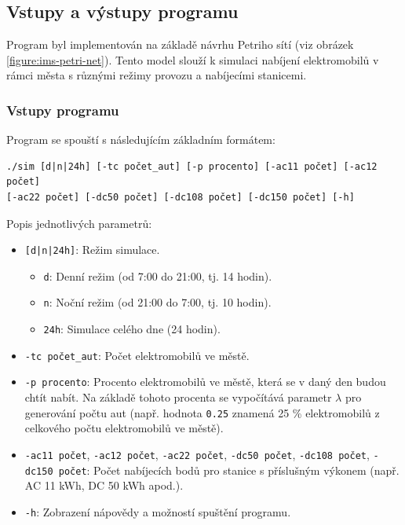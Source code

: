 \documentclass[a4paper,11pt]{article}
\begin{document}
\subsection{Vstupy a výstupy programu}

Program byl implementován na základě návrhu Petriho sítí (viz obrázek \ref{figure:ims-petri-net}). Tento model slouží k simulaci nabíjení elektromobilů v rámci města s různými režimy provozu a nabíjecími stanicemi.

\subsubsection{Vstupy programu}

Program se spouští s následujícím základním formátem:

\begin{verbatim}
./sim [d|n|24h] [-tc počet_aut] [-p procento] [-ac11 počet] [-ac12 počet]
[-ac22 počet] [-dc50 počet] [-dc108 počet] [-dc150 počet] [-h]
\end{verbatim}

Popis jednotlivých parametrů:
\begin{itemize}
    \item \texttt{[d|n|24h]}: Režim simulace.
    \begin{itemize}
        \item \texttt{d}: Denní režim (od 7:00 do 21:00, tj. 14 hodin).
        \item \texttt{n}: Noční režim (od 21:00 do 7:00, tj. 10 hodin).
        \item \texttt{24h}: Simulace celého dne (24 hodin).
    \end{itemize}
    \item \texttt{-tc počet\_aut}: Počet elektromobilů ve městě.
    \item \texttt{-p procento}: Procento elektromobilů ve městě, která se v daný den budou chtít nabít. Na základě tohoto procenta se vypočítává parametr \(\lambda\) pro generování počtu aut (např. hodnota \texttt{0.25} znamená 25 \% elektromobilů z celkového počtu elektromobilů ve městě).
    \item \texttt{-ac11 počet}, \texttt{-ac12 počet}, \texttt{-ac22 počet}, \texttt{-dc50 počet}, \texttt{-dc108 počet}, \texttt{-dc150 počet}: Počet nabíjecích bodů pro stanice s příslušným výkonem (např. AC 11 kWh, DC 50 kWh apod.).
    \item \texttt{-h}: Zobrazení nápovědy a možností spuštění programu.
\end{itemize}
\end{document}

